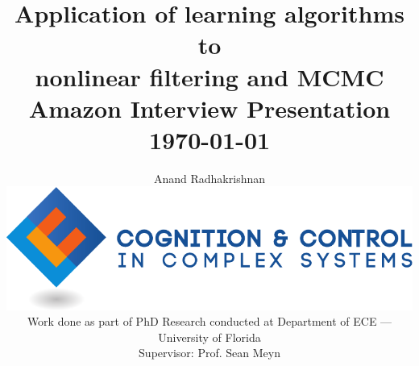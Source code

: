 \documentclass[xcolor=dvipsnames, subsection=false]{beamer}
\def\alertc#1{\alert{\color{MyDarkBlue}  #1}}
\def\alertc#1{\alert{\color{MyDarkBlue}  #1}}
\begin{document}
\thispagestyle{empty}
\setcounter{page}{0}



\title{\Large
	\textbf{Application of learning algorithms to
		\\
		nonlinear filtering and MCMC}
	\\[.5em]
	\normalsize
	Amazon Interview Presentation
	\\[.5em]
	\scriptsize
	\today}

\author{
	\small Anand Radhakrishnan
	\\[.2cm]
	\href{http://ccc.centers.ufl.edu/}{\includegraphics[width=.2\hsize]{c3logocmyk.pdf}}
	\\[.2cm]
	\small
	\scriptsize
	Work done as part of PhD Research conducted at Department of ECE
	---
	University of Florida
	\\[.3cm]\color{Sepia}
	\scriptsize
	Supervisor: \alertc{Prof. Sean Meyn}
}
\date{}

\frame{\titlepage}
\end{document}
